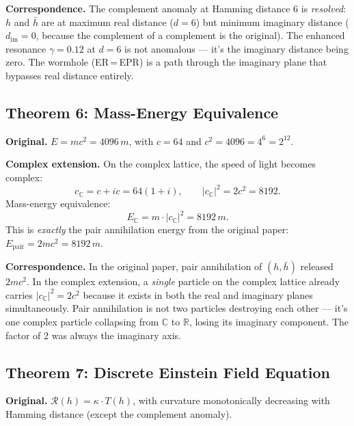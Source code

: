 \documentclass[12pt,a4paper]{article}
\theoremstyle{definition}
\theoremstyle{remark}
\newcommand{\CC}{\mathbb{C}}
\newcommand{\RR}{\mathbb{R}}
\newcommand{\RR}{\mathbf{R}}
\begin{document}
\medskip\noindent\textbf{Correspondence.}
The complement anomaly at Hamming distance 6 is \emph{resolved}: $h$ and
$\bar{h}$ are at maximum real distance ($d=6$) but minimum imaginary
distance ($d_{\mathrm{im}} = 0$, because the complement of a complement is
the original). The enhanced resonance $\gamma = 0.12$ at $d=6$ is not
anomalous --- it's the imaginary distance being zero. The wormhole
(ER\,=\,EPR) is a path through the imaginary plane that bypasses real
distance entirely.

\bigskip

\subsection{Theorem 6: Mass-Energy Equivalence}

\noindent\textbf{Original.}
$E = mc^2 = 4096\,m$, with $c = 64$ and $c^2 = 4096 = 4^6 = 2^{12}$.

\medskip\noindent\textbf{Complex extension.}
On the complex lattice, the speed of light becomes complex:
\begin{equation}
  c_\CC = c + ic = 64(1 + i), \qquad |c_\CC|^2 = 2c^2 = 8192.
\end{equation}
Mass-energy equivalence:
\begin{equation}\label{eq:complex-emc2}
  E_\CC = m \cdot |c_\CC|^2 = 8192\,m.
\end{equation}
This is \emph{exactly} the pair annihilation energy from the original paper:
$E_{\mathrm{pair}} = 2mc^2 = 8192\,m$.

\medskip\noindent\textbf{Correspondence.}
In the original paper, pair annihilation of $(h, \bar{h})$ released
$2mc^2$. In the complex extension, a \emph{single} particle on the complex
lattice already carries $|c_\CC|^2 = 2c^2$ because it exists in both the
real and imaginary planes simultaneously. Pair annihilation is not two
particles destroying each other --- it's one complex particle collapsing
from $\CC$ to $\RR$, losing its imaginary component. The factor of 2 was
always the imaginary axis.

\bigskip

\subsection{Theorem 7: Discrete Einstein Field Equation}

\noindent\textbf{Original.}
$\mathcal{R}(h) = \kappa \cdot T(h)$, with curvature monotonically
decreasing with Hamming distance (except the complement anomaly).
\end{document}
